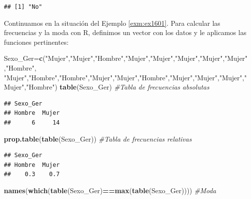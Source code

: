 \documentclass[]{book}
\newenvironment{Shaded}{\begin{snugshade}}{\end{snugshade}}
\newcommand{\CommentTok}[1]{\textcolor[rgb]{0.56,0.35,0.01}{\textit{#1}}}
\newcommand{\KeywordTok}[1]{\textcolor[rgb]{0.13,0.29,0.53}{\textbf{#1}}}
\newcommand{\NormalTok}[1]{#1}
\newcommand{\OperatorTok}[1]{\textcolor[rgb]{0.81,0.36,0.00}{\textbf{#1}}}
\newcommand{\StringTok}[1]{\textcolor[rgb]{0.31,0.60,0.02}{#1}}
\theoremstyle{definition}
\theoremstyle{definition}
\theoremstyle{definition}
\theoremstyle{remark}
\let\BeginKnitrBlock\begin \let\EndKnitrBlock\end
\begin{document}
\begin{verbatim}
## [1] "No"
\end{verbatim}

\BeginKnitrBlock{example}
\protect\hypertarget{exm:sexo}{}{\label{exm:sexo} }Continuamos en la situación del Ejemplo \ref{exm:ex1601}. Para calcular las frecuencias y la moda con R, definimos un vector con los datos y le aplicamos las funciones pertinentes:
\EndKnitrBlock{example}

\begin{Shaded}
\begin{Highlighting}[]
\NormalTok{Sexo_Ger=}\KeywordTok{c}\NormalTok{(}\StringTok{"Mujer"}\NormalTok{,}\StringTok{"Mujer"}\NormalTok{,}\StringTok{"Hombre"}\NormalTok{,}\StringTok{"Mujer"}\NormalTok{,}\StringTok{"Mujer"}\NormalTok{,}\StringTok{"Mujer"}\NormalTok{,}\StringTok{"Mujer"}\NormalTok{,}\StringTok{"Mujer"}\NormalTok{,}\StringTok{"Hombre"}\NormalTok{,}
  \StringTok{"Mujer"}\NormalTok{,}\StringTok{"Hombre"}\NormalTok{,}\StringTok{"Hombre"}\NormalTok{,}\StringTok{"Mujer"}\NormalTok{,}\StringTok{"Mujer"}\NormalTok{,}\StringTok{"Hombre"}\NormalTok{,}\StringTok{"Mujer"}\NormalTok{,}\StringTok{"Mujer"}\NormalTok{,}\StringTok{"Mujer"}\NormalTok{,}\StringTok{"Mujer"}\NormalTok{,}\StringTok{"Hombre"}\NormalTok{)}
\KeywordTok{table}\NormalTok{(Sexo_Ger)  }\CommentTok{#Tabla de frecuencias absolutas}
\end{Highlighting}
\end{Shaded}

\begin{verbatim}
## Sexo_Ger
## Hombre  Mujer 
##      6     14
\end{verbatim}

\begin{Shaded}
\begin{Highlighting}[]
\KeywordTok{prop.table}\NormalTok{(}\KeywordTok{table}\NormalTok{(Sexo_Ger)) }\CommentTok{#Tabla de frecuencias relativas}
\end{Highlighting}
\end{Shaded}

\begin{verbatim}
## Sexo_Ger
## Hombre  Mujer 
##    0.3    0.7
\end{verbatim}

\begin{Shaded}
\begin{Highlighting}[]
\KeywordTok{names}\NormalTok{(}\KeywordTok{which}\NormalTok{(}\KeywordTok{table}\NormalTok{(Sexo_Ger)}\OperatorTok{==}\KeywordTok{max}\NormalTok{(}\KeywordTok{table}\NormalTok{(Sexo_Ger)))) }\CommentTok{#Moda}
\end{Highlighting}
\end{Shaded}
\end{document}
